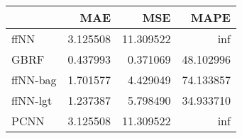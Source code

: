 \begin{tabular}{lrrr}
\toprule
{} &       MAE &        MSE &       MAPE \\
\midrule
ffNN     &  3.125508 &  11.309522 &        inf \\
GBRF     &  0.437993 &   0.371069 &  48.102996 \\
ffNN-bag &  1.701577 &   4.429049 &  74.133857 \\
ffNN-lgt &  1.237387 &   5.798490 &  34.933710 \\
PCNN     &  3.125508 &  11.309522 &        inf \\
\bottomrule
\end{tabular}
